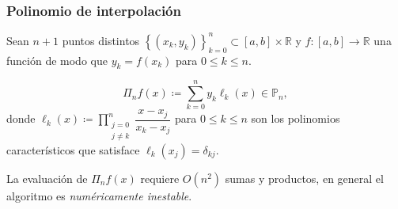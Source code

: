 \begin{frame}
	\frametitle{Polinomio de interpolación}

	Sean $n+1$ puntos distintos
	\begin{math}
		{
			\left\{
			\left(x_{k},y_{k}\right)
			\right\}
		}_{k=0}^{n}\subset
		\left[a,b\right]\times\mathbb{R}
	\end{math}
	y
	\begin{math}
		f\colon\left[a,b\right]\to
		\mathbb{R}
	\end{math}
	una función de modo que
	\begin{math}
		y_{k}=
		f\left(x_{k}\right)
	\end{math}
	para $0\leq k\leq n$.

	\begin{definition}
		\begin{equation*}
			\Pi_{n}
			f\left(x\right)\coloneqq
			\sum\limits_{k=0}^{n}
			y_{k}
			\ell_{k}\left(x\right)\in\mathbb{P}_{n},
		\end{equation*}
		donde
		\begin{math}
			\ell_{k}
			\left(x\right)\coloneqq
			\prod\limits_{\substack{j=0\\j\neq k}}^{n}
			\dfrac{x-x_{j}}{x_{k}-x_{j}}
		\end{math}
		para $0\leq k\leq n$ son los \alert{polinomios característicos}
		que satisface
		\begin{math}
			\ell_{k}
			\left(x_{j}\right)=
			\delta_{kj}
		\end{math}.

		La evaluación de $\Pi_{n}f\left(x\right)$ requiere
		$O\left(n^{2}\right)$ sumas y productos, en general el algoritmo
		es \emph{numéricamente inestable}.
	\end{definition}



\end{frame}
